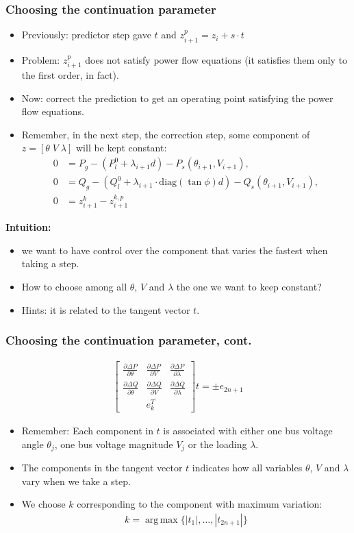 \documentclass{beamer}
\DeclareMathOperator*{\argmax}{arg\,max}
\begin{document}
\begin{frame}
  \frametitle{Choosing the continuation parameter}
  \begin{itemize}
  \item Previously: predictor step gave $t$ and $z_{i+1}^p = z_i + s \cdot t$
  \item Problem: $z_{i+1}^p$ does not satisfy power flow equations (it satisfies them only to the first order, in fact).
  \item Now: correct the prediction to get an operating point satisfying the power flow equations.
\item Remember, in the next step, the correction step, some component of $z=[\theta \; V \; \lambda]$ will be kept constant:
\begin{align}
      0 &= P_g - (P_l^0 + \lambda_{i+1} d) - P_s(\theta_{i+1},V_{i+1}),\\
      0 &= Q_g - (Q_l^0 + \lambda_{i+1} \cdot \text{diag}(\tan \phi) d)- Q_s(\theta_{i+1},V_{i+1}), \\
      0 &= z_{i+1}^{k}-z_{i+1}^{k,p} \label{eq:corr-param}
\end{align}
  \end{itemize}
\textbf{Intuition:}
\begin{itemize}
\item we want to have control over the component that varies the fastest when taking a step.
\item How to choose among all $\theta$, $V$ and $\lambda$ the one we want to keep constant?
\item Hints: it is related to the tangent vector $t$.
\end{itemize}
\end{frame}

\begin{frame}
  \frametitle{Choosing the continuation parameter, cont.}
\begin{align}
  \begin{bmatrix}
  \frac{\partial \Delta P}{\partial \theta} & \frac{\partial \Delta P}{\partial V} & \frac{\partial \Delta P}{\partial \lambda} \\
  \frac{\partial \Delta Q}{\partial \theta} & \frac{\partial \Delta Q}{\partial V} & \frac{\partial \Delta Q}{\partial \lambda} \\
   & e_k^T & 
  \end{bmatrix} t = \pm e_{2n+1}
\end{align}
  \begin{itemize}
  \item Remember: Each component in $t$ is associated with either one bus voltage angle $\theta_j$, one bus voltage magnitude $V_j$ or the loading $\lambda$.
  \item The components in the tangent vector $t$ indicates how all variables $\theta$, $V$ and $\lambda$ vary when we take a step.
  \item We choose $k$ corresponding to the component with maximum variation:
    \begin{align}
      \label{eq:1}
      k = \argmax \{|t_1|,\ldots,|t_{2n+1}|\}
    \end{align}
  \end{itemize}
\end{frame}
\end{document}
